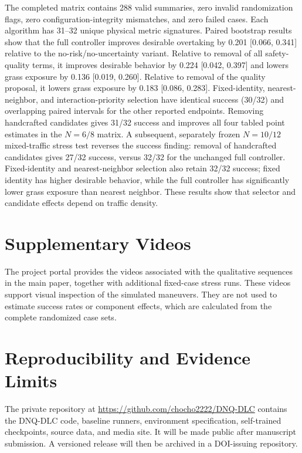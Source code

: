\documentclass[journal]{IEEEtran}
\begin{document}
The completed matrix contains 288 valid summaries, zero invalid
randomization flags, zero configuration-integrity mismatches, and zero
failed cases. Each algorithm has 31--32 unique physical metric
signatures. Paired bootstrap results show that the full controller
improves desirable overtaking by 0.201 [0.066, 0.341] relative to the
no-risk/no-uncertainty variant. Relative to removal of all
safety-quality terms, it improves desirable behavior by 0.224
[0.042, 0.397] and lowers grass exposure by 0.136 [0.019, 0.260].
Relative to removal of the quality proposal, it lowers grass exposure
by 0.183 [0.086, 0.283]. Fixed-identity, nearest-neighbor, and
interaction-priority selection have identical success (30/32) and
overlapping paired intervals for the other reported endpoints. Removing
handcrafted candidates gives 31/32 success and improves all four tabled
point estimates in the $N=6/8$ matrix. A subsequent, separately frozen
$N=10/12$ mixed-traffic stress test reverses the success finding:
removal of handcrafted candidates gives 27/32 success, versus 32/32 for
the unchanged full controller. Fixed-identity and nearest-neighbor
selection also retain 32/32 success; fixed identity has higher desirable
behavior, while the full controller has significantly lower grass
exposure than nearest neighbor. These results show that selector and candidate effects depend on traffic
density.

\section{Supplementary Videos}
\label{supp:visual_evidence}

The project portal provides the videos associated with the qualitative
sequences in the main paper, together with additional fixed-case stress
runs. These videos support visual inspection of the simulated maneuvers.
They are not used to estimate success rates or component effects, which
are calculated from the complete randomized case sets.

\section{Reproducibility and Evidence Limits}
\label{supp:claim_boundary}

The private repository at
\url{https://github.com/chocho2222/DNQ-DLC} contains the DNQ-DLC code,
baseline runners, environment specification, self-trained checkpoints,
source data, and media site. It will be made public after manuscript
submission. A versioned release will then be archived in a DOI-issuing
repository.
\end{document}
